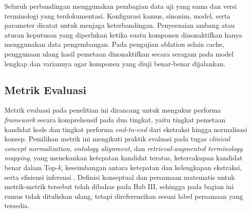 Seluruh perbandingan menggunakan pembagian data uji yang sama dan versi terminologi yang terdokumentasi. Konfigurasi kamus, sinonim, model, serta parameter dicatat untuk menjaga keterbandingan. Penyesuaian ambang atau aturan keputusan yang diperlukan ketika suatu komponen dinonaktifkan hanya menggunakan data pengembangan. Pada pengujian ablation selain cache, penggunaan ulang hasil pemetaan dinonaktifkan secara seragam pada model lengkap dan variannya agar komponen yang diuji benar-benar dijalankan.

\subsection{Metrik Evaluasi}

Metrik evaluasi pada penelitian ini dirancang untuk mengukur performa \textit{framework} secara komprehensif pada dua tingkat, yaitu tingkat pemetaan kandidat kode dan tingkat performa \textit{end-to-end} dari ekstraksi hingga normalisasi konsep. Pemilihan metrik ini mengikuti praktik evaluasi pada tugas \textit{clinical concept normalization}, \textit{ontology alignment}, dan \textit{retrieval-augmented terminology mapping}, yang menekankan ketepatan kandidat teratas, ketercakupan kandidat benar dalam Top-\textit{k}, keseimbangan antara ketepatan dan kelengkapan ekstraksi, serta efisiensi inferensi \citep{chen_clinical_2020,he_bertmap_2022,gilani_cde-mapper_2025,park_development_2026,yu_large_2026}. Definisi konseptual dan persamaan matematis untuk metrik-metrik tersebut telah dibahas pada Bab III, sehingga pada bagian ini rumus tidak dituliskan ulang, tetapi direferensikan sesuai label persamaan yang tersedia.

